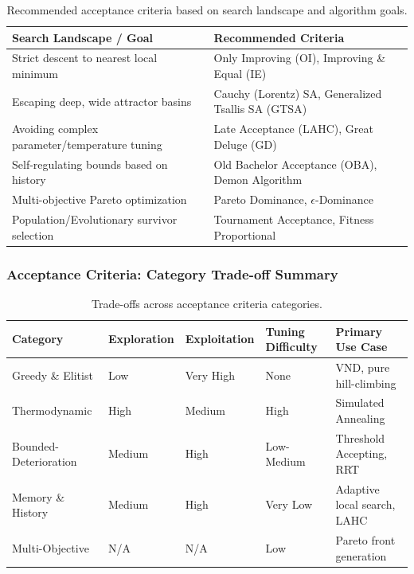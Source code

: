 \documentclass{article}
\begin{document}
\begin{table}[H]
    \centering
    \caption{Recommended acceptance criteria based on search landscape and algorithm goals.}
    \begin{tabularx}{\textwidth}{@{} l X @{}}
        \toprule
        \textbf{Search Landscape / Goal} & \textbf{Recommended Criteria} \\
        \midrule
        Strict descent to nearest local minimum & Only Improving (OI), Improving \& Equal (IE) \\
        Escaping deep, wide attractor basins & Cauchy (Lorentz) SA, Generalized Tsallis SA (GTSA) \\
        Avoiding complex parameter/temperature tuning & Late Acceptance (LAHC), Great Deluge (GD) \\
        Self-regulating bounds based on history & Old Bachelor Acceptance (OBA), Demon Algorithm \\
        Multi-objective Pareto optimization & Pareto Dominance, $\epsilon$-Dominance \\
        Population/Evolutionary survivor selection & Tournament Acceptance, Fitness Proportional \\
        \bottomrule
    \end{tabularx}
\end{table}

\subsubsection*{Acceptance Criteria: Category Trade-off Summary}

\begin{table}[H]
    \centering
    \caption{Trade-offs across acceptance criteria categories.}
    \begin{tabularx}{\textwidth}{@{} X l l l X @{}}
        \toprule
        \textbf{Category} & \textbf{Exploration} & \textbf{Exploitation} & \textbf{Tuning Difficulty} & \textbf{Primary Use Case} \\
        \midrule
        Greedy \& Elitist & Low & Very High & None & VND, pure hill-climbing \\
        Thermodynamic & High & Medium & High & Simulated Annealing \\
        Bounded-Deterioration& Medium & High & Low-Medium & Threshold Accepting, RRT \\
        Memory \& History & Medium & High & Very Low & Adaptive local search, LAHC \\
        Multi-Objective & N/A & N/A & Low & Pareto front generation \\
        \bottomrule
    \end{tabularx}
\end{table}
\end{document}
